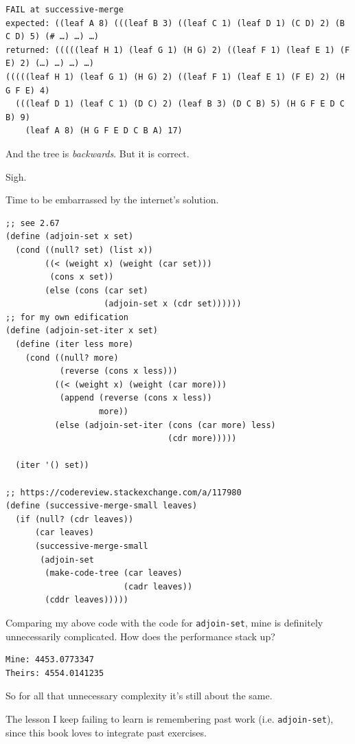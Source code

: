 \documentclass[final,fleqn,titlepage,twoside]{article}
\begin{document}
\begin{verbatim}
FAIL at successive-merge
expected: ((leaf A 8) (((leaf B 3) ((leaf C 1) (leaf D 1) (C D) 2) (B C D) 5) (# …) …) …)
returned: (((((leaf H 1) (leaf G 1) (H G) 2) ((leaf F 1) (leaf E 1) (F E) 2) (…) …) …) …)
(((((leaf H 1) (leaf G 1) (H G) 2) ((leaf F 1) (leaf E 1) (F E) 2) (H G F E) 4)
  (((leaf D 1) (leaf C 1) (D C) 2) (leaf B 3) (D C B) 5) (H G F E D C B) 9)
    (leaf A 8) (H G F E D C B A) 17) 
\end{verbatim}

And the tree is \emph{backwards}. But it is correct. \begin{tiny}Sigh.\end{tiny}

Time to be embarrassed by the internet's solution.

\begin{verbatim}
;; see 2.67
(define (adjoin-set x set)
  (cond ((null? set) (list x))
        ((< (weight x) (weight (car set)))
         (cons x set))
        (else (cons (car set)
                    (adjoin-set x (cdr set))))))
;; for my own edification
(define (adjoin-set-iter x set)
  (define (iter less more)
    (cond ((null? more)
           (reverse (cons x less)))
          ((< (weight x) (weight (car more)))
           (append (reverse (cons x less))
                   more))
          (else (adjoin-set-iter (cons (car more) less)
                                 (cdr more)))))

  (iter '() set))

;; https://codereview.stackexchange.com/a/117980
(define (successive-merge-small leaves)
  (if (null? (cdr leaves))
      (car leaves)
      (successive-merge-small
       (adjoin-set
        (make-code-tree (car leaves)
                        (cadr leaves))
        (cddr leaves)))))
\end{verbatim}

Comparing my above code with the code for \texttt{adjoin-set}, mine is
definitely unnecessarily complicated. How does the performance stack up?

\begin{verbatim}
Mine: 4453.0773347
Theirs: 4554.0141235
\end{verbatim}

So for all that unnecessary complexity it's still about the same.

The lesson I keep failing to learn is remembering past work (i.e.
\texttt{adjoin-set}), since this book loves to integrate past exercises.
\end{document}
